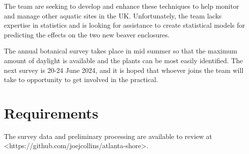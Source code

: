 \documentclass[10pt]{article}
\begin{document}
The team are seeking to develop and enhance these techniques
to help monitor and manage other aquatic sites in the UK.
Unfortunately, the team lacks expertise in statistics
and is looking for assistance to create statistical models for predicting the effects
on the two new beaver enclosures.

The annual botanical survey takes place in mid summer
so that the maximum amount of daylight is available
and the plants can be most easily identified.
The next survey is 20-24 June 2024,
and it is hoped that whoever joins the team
will take to opportunity to get involved in the practical.

\section*{Requirements}

The survey data and preliminary processing are available
to review at <https://github.com/joejcollins/atlanta-shore>.
\end{document}
